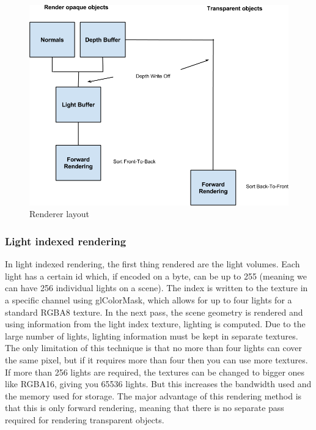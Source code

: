 \begin{center}
	\begin{figure}[here]
		
		\includegraphics[width=\textwidth]{src/img/lightning1.png}
		\caption{Renderer layout}
		\label{img:lightning1}
	\end{figure}
\end{center}

\subsubsection{Light indexed rendering}

In light indexed rendering, the first thing rendered are the light volumes. Each light has a certain id which, if encoded on a byte, can be up to 255 (meaning we can have 256 individual lights on a scene). The index is written to the texture in a specific channel using glColorMask, which allows for up to four lights for a standard RGBA8 texture.
In the next pass, the scene geometry is rendered and using information from the light index texture, lighting is computed.
Due to the large number of lights, lighting information must be kept in separate textures.
The only limitation of this technique is that no more than four lights can cover the same pixel, but if it requires more than four then you can use more textures. If more than 256 lights are required, the textures can be changed to bigger ones like RGBA16, giving you 65536 lights. But this increases the bandwidth used and the memory used for storage.
The major advantage of this rendering method is that this is only forward rendering, meaning that there is no separate pass required for rendering transparent objects.

